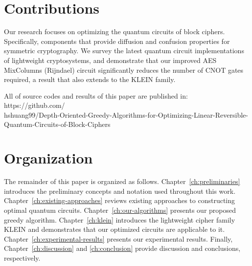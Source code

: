 \section{Contributions}
Our research focuses on optimizing the quantum circuits of block ciphers. Specifically, components that provide diffusion and confusion properties for symmetric cryptography. We survey the latest quantum circuit implementations of lightweight cryptosystems, and demonstrate that our improved AES MixColumns (Rijndael) circuit significantly reduces the number of CNOT gates required, a result that also extends to the KLEIN family.

All of source codes and results of this paper are published in: https://github.com/\\hshuang99/Depth-Oriented-Greedy-Algorithms-for-Optimizing-Linear-Reversible-\\Quantum-Circuits-of-Block-Ciphers

\section{Organization}
The remainder of this paper is organized as follows. Chapter~\ref{ch:preliminaries} introduces the preliminary concepts and notation used throughout this work. Chapter~\ref{ch:existing-approaches} reviews existing approaches to constructing optimal quantum circuits. Chapter~\ref{ch:our-algorithms} presents our proposed greedy algorithm. Chapter~\ref{ch:klein} introduces the lightweight cipher family KLEIN and demonstrates that our optimized circuits are applicable to it. Chapter~\ref{ch:experimental-results} presents our experimental results. Finally, Chapter~\ref{ch:discussion} and \ref{ch:conclusion} provide discussion and conclusions, respectively.